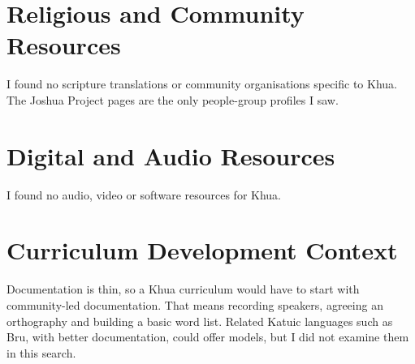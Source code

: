 \documentclass[12pt]{article}
\begin{document}
\section{Religious and Community Resources}
I found no scripture translations or community organisations specific to Khua. The Joshua Project pages are the only people-group profiles I saw.

\section{Digital and Audio Resources}
I found no audio, video or software resources for Khua.

\section{Curriculum Development Context}
Documentation is thin, so a Khua curriculum would have to start with community-led documentation. That means recording speakers, agreeing an orthography and building a basic word list. Related Katuic languages such as Bru, with better documentation, could offer models, but I did not examine them in this search.
\end{document}
